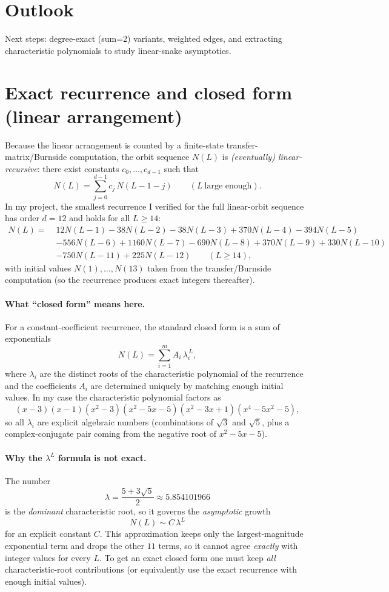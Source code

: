 \documentclass[12pt]{article}
\theoremstyle{definition}
\begin{document}
\section{Outlook}
Next steps: degree-exact (sum=2) variants, weighted edges, and extracting characteristic polynomials to study linear-snake asymptotics.

\section{Exact recurrence and closed form (linear arrangement)}
Because the linear arrangement is counted by a finite-state transfer-matrix/Burnside computation, the orbit sequence \(N(L)\) is \emph{(eventually) linear-recursive}: there exist constants \(c_0,\dots,c_{d-1}\) such that
\[
N(L)=\sum_{j=0}^{d-1} c_j\,N(L-1-j)\qquad (L\ \text{large enough}).
\]
In my project, the smallest recurrence I verified for the full linear-orbit sequence has order \(d=12\) and holds for all \(L\ge 14\):
\[
\begin{aligned}
N(L)=\;&12N(L-1)-38N(L-2)-38N(L-3)+370N(L-4)-394N(L-5)\\
&-556N(L-6)+1160N(L-7)-690N(L-8)+370N(L-9)+330N(L-10)\\
&-750N(L-11)+225N(L-12)\qquad(L\ge 14),
\end{aligned}
\]
with initial values \(N(1),\dots,N(13)\) taken from the transfer/Burnside computation (so the recurrence produces exact integers thereafter).

\paragraph{What ``closed form'' means here.}
For a constant-coefficient recurrence, the standard closed form is a sum of exponentials
\[
N(L)=\sum_{i=1}^{m} A_i\,\lambda_i^{\,L},
\]
where \(\lambda_i\) are the distinct roots of the characteristic polynomial of the recurrence and the coefficients \(A_i\) are determined uniquely by matching enough initial values. In my case the characteristic polynomial factors as
\[
(x-3)(x-1)(x^2-3)(x^2-5x-5)(x^2-3x+1)(x^4-5x^2-5),
\]
so all \(\lambda_i\) are explicit algebraic numbers (combinations of \(\sqrt{3}\) and \(\sqrt{5}\), plus a complex-conjugate pair coming from the negative root of \(x^2-5x-5\)).

\paragraph{Why the \(\lambda^L\) formula is not exact.}
The number
\[
\lambda=\frac{5+3\sqrt5}{2}\approx 5.854101966
\]
is the \emph{dominant} characteristic root, so it governs the \emph{asymptotic} growth
\[
N(L)\sim C\,\lambda^L
\]
for an explicit constant \(C\). This approximation keeps only the largest-magnitude exponential term and drops the other \(11\) terms, so it cannot agree \emph{exactly} with integer values for every \(L\). To get an exact closed form one must keep \emph{all} characteristic-root contributions (or equivalently use the exact recurrence with enough initial values).
\end{document}
